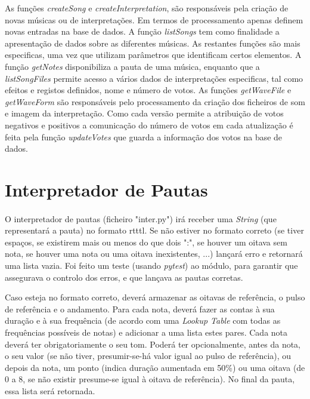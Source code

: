 \documentclass[11pt,openany,twoside]{report}
\begin{document}
As funções \textit{createSong} e \textit{createInterpretation}, são responsáveis pela criação de novas músicas ou de interpretações. Em termos de processamento apenas definem novas entradas na base de dados. A função \textit{listSongs} tem como finalidade a apresentação de dados sobre as diferentes músicas. As restantes funções são mais especificas, uma vez que utilizam parâmetros que identificam certos elementos. A função \textit{getNotes} disponibiliza a pauta de uma música, enquanto que a \textit{listSongFiles} permite acesso a vários dados de interpretações especificas, tal como efeitos e registos definidos, nome e número de votos. As funções \textit{getWaveFile} e \textit{getWaveForm} são responsáveis pelo processamento da criação dos ficheiros de som e imagem da interpretação. Como cada versão permite a atribuição de votos negativos e positivos a comunicação do número de votos em cada atualização é feita pela função \textit{updateVotes} que guarda a informação dos votos na base de dados.


\section{Interpretador de Pautas}
\paragraph{ } O interpretador de pautas (ficheiro "inter.py") irá receber uma \textit{String} (que representará a pauta) no formato \acs{rtttl}. Se não estiver no formato correto (se tiver espaços, se existirem mais ou menos do que dois ":", se houver um oitava sem nota, se houver uma nota ou uma oitava inexistentes, ...) lançará erro e retornará uma lista vazia. Foi feito um teste (usando \textit{pytest}) ao módulo, para garantir que assegurava o controlo dos erros, e que lançava as pautas corretas.

Caso esteja no formato correto, deverá armazenar as oitavas de referência, o pulso de referência e o andamento. Para cada nota, deverá fazer as contas à sua duração e à sua frequência (de acordo com uma \textit{Lookup Table} com todas as frequências possíveis de notas) e adicionar a uma lista estes pares. Cada nota deverá ter obrigatoriamente o seu tom. Poderá ter opcionalmente, antes da nota, o seu valor (se não tiver, presumir-se-há valor igual ao pulso de referência), ou depois da nota, um ponto (indica duração aumentada em 50\%) ou uma oitava (de 0 a 8, se não existir presume-se igual à oitava de referência). No final da pauta, essa lista será retornada.
\end{document}
